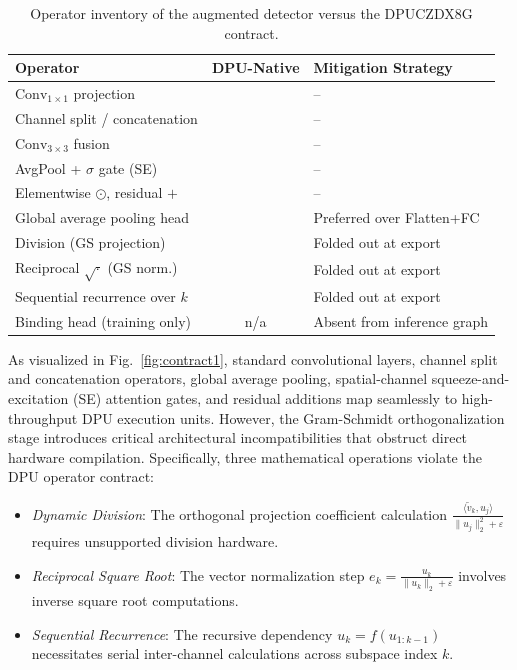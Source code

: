 \documentclass[algorithms,article,submit,moreauthors]{Definitions/mdpi}
\newcommand{\cmark}{\ding{51}}
\newcommand{\xmark}{\ding{55}}
\begin{document}
\begin{table}[!h]
\centering
\caption{Operator inventory of the augmented detector versus the DPUCZDX8G contract.}
\label{tab:ops1}
\setlength{\tabcolsep}{5pt}
\renewcommand{\arraystretch}{1.2}
\begin{tabular}{lcl}
\toprule
Operator & DPU-Native & Mitigation Strategy \\
\midrule
$\mathrm{Conv}_{1\times1}$ projection & \cmark & -- \\
Channel split / concatenation & \cmark & -- \\
$\mathrm{Conv}_{3\times3}$ fusion & \cmark & -- \\
AvgPool + $\sigma$ gate (SE) & \cmark & -- \\
Elementwise $\odot$, residual $+$ & \cmark & -- \\
Global average pooling head & \cmark & Preferred over Flatten+FC \\
\midrule
Division (GS projection) & \xmark & Folded out at export\\
Reciprocal $\sqrt{\cdot}$ (GS norm.) & \xmark & Folded out at export  \\
Sequential recurrence over $k$ & \xmark & Folded out at export \\
Binding head (training only) & n/a & Absent from inference graph \\
\bottomrule
\end{tabular}
\end{table}

As visualized in Fig.~\ref{fig:contract1}, standard convolutional layers, channel split and concatenation operators, global average pooling, spatial-channel squeeze-and-excitation (SE) attention gates, and residual additions map seamlessly to high-throughput DPU execution units. However, the Gram-Schmidt orthogonalization stage introduces critical architectural incompatibilities that obstruct direct hardware compilation. Specifically, three mathematical operations violate the DPU operator contract:
\begin{itemize}
    \item \emph{Dynamic Division}: The orthogonal projection coefficient calculation $\frac{\langle \tilde{v}_k, u_j \rangle}{\lVert u_j \rVert_2^2 + \varepsilon}$ requires unsupported division hardware.
    \item \emph{Reciprocal Square Root}: The vector normalization step $e_k = \frac{u_k}{\lVert u_k \rVert_2 + \varepsilon}$ involves inverse square root computations.
    \item \emph{Sequential Recurrence}: The recursive dependency $u_k = f(u_{1:k-1})$ necessitates serial inter-channel calculations across subspace index $k$.
\end{itemize}
\end{document}
